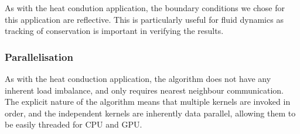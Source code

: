 \documentclass[runningheads,a4paper]{llncs}
\begin{document}
As with the heat condution application, the boundary conditions we chose for this application are reflective. This is particularly useful for fluid dynamics as tracking of conservation is important in verifying the results.

\subsubsection{Parallelisation}

As with the heat conduction application, the algorithm does not have any inherent load imbalance, and only requires nearest neighbour communication. The explicit nature of the algorithm means that multiple kernels are invoked in order, and the independent kernels are inherently data parallel, allowing them to be easily threaded for CPU and GPU.
\end{document}
